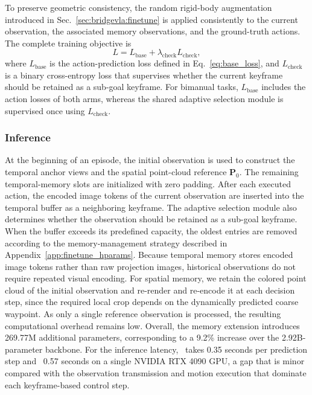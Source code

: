 To preserve geometric consistency, the random rigid-body augmentation
introduced in Sec.~\ref{sec:bridgevla:finetune} is applied consistently to
the current observation, the associated memory observations, and the
ground-truth actions.
The complete training objective is
\begin{equation}
    L
    =
    L_{\mathrm{base}}
    +
    \lambda_{\mathrm{check}}
    L_{\mathrm{check}},
    \label{eq:memory_training_loss}
\end{equation}
where $L_{\mathrm{base}}$ is the action-prediction loss defined in
Eq.~\eqref{eq:base_loss}, and $L_{\mathrm{check}}$ is a binary
cross-entropy loss that supervises whether the current keyframe should be retained as a sub-goal keyframe.
For bimanual tasks, $L_{\mathrm{base}}$ includes the action losses of both
arms, whereas the shared adaptive selection module is supervised once using
$L_{\mathrm{check}}$.


\subsubsection{Inference}

At the beginning of an episode, the initial observation is used to construct
the temporal anchor views and the spatial point-cloud reference
$\mathbf{P}_0$.
The remaining temporal-memory slots are initialized with zero padding.
After each executed action, the encoded image tokens of the current
observation are inserted into the temporal buffer as a neighboring
keyframe.
The adaptive selection module also determines whether the observation should
be retained as a sub-goal keyframe.
When the buffer exceeds its predefined capacity, the oldest entries are
removed according to the memory-management strategy described in
Appendix~\ref{app:finetune_hparams}.
Because temporal memory stores encoded image tokens rather than raw
projection images, historical observations do not require repeated visual encoding.
For spatial memory, we retain the colored point cloud of the initial observation and re-render and re-encode it at each decision step, since the required local crop depends on the dynamically predicted coarse waypoint. As only a single reference observation is processed, the resulting computational overhead remains low.
Overall, the memory extension introduces 269.77M additional parameters,
corresponding to a 9.2\% increase over the 2.92B-parameter backbone.
For the inference latency, \method\ takes 0.35 seconds per prediction step and \memmethod\ 0.57 seconds on a single NVIDIA RTX 4090 GPU, a gap that is minor compared with the observation transmission and motion execution that dominate each keyframe-based control step.